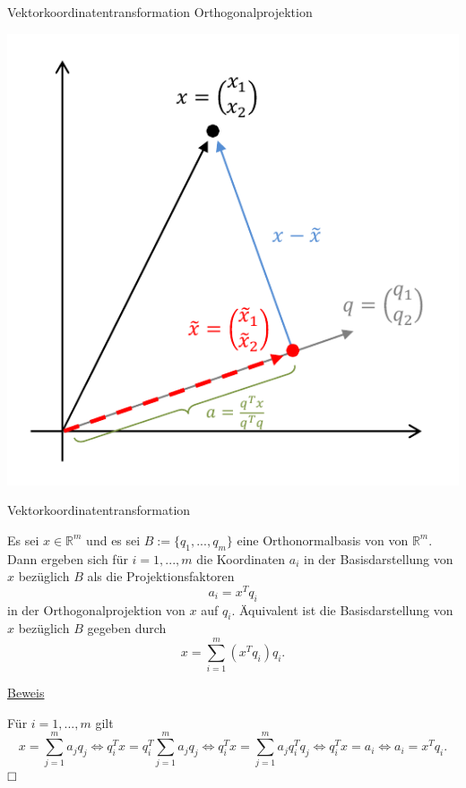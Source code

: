 \documentclass[
  8pt,
  ignorenonframetext,
]{beamer}
\begin{document}
\begin{frame}{Vektorkoordinatentransformation}
\protect\hypertarget{vektorkoordinatentransformation-2}{}
Orthogonalprojektion

\begin{center}\includegraphics[width=0.6\linewidth]{4_Abbildungen/mvda_4_orthogonale_vektorprojektion} \end{center}
\end{frame}

\begin{frame}{Vektorkoordinatentransformation}
\protect\hypertarget{vektorkoordinatentransformation-3}{}
\footnotesize
\begin{theorem}
\justifying
\normalfont
Es sei $x \in \mathbb{R}^m$ und es sei $B := \{q_1,...,q_m\}$ eine Orthonormalbasis
von von $\mathbb{R}^m$. Dann ergeben sich für $i = 1,...,m$ die Koordinaten $a_i$ in
der Basisdarstellung von $x$ bezüglich $B$ als die Projektionsfaktoren
\begin{equation}
a_i = x^T q_i
\end{equation}
in der Orthogonalprojektion von $x$ auf $q_i$. Äquivalent ist die
Basisdarstellung von $x$ bezüglich $B$ gegeben durch
\begin{equation}
x = \sum_{i=1}^m (x^T q_i)q_i.
\end{equation}
\end{theorem}

\footnotesize

\underline{Beweis}

Für \(i = 1,...,m\) gilt \begin{equation}
x = \sum_{j=1}^m a_j q_j
\Leftrightarrow
q_i^T x = q_i^T \sum_{j=1}^m a_j q_j
\Leftrightarrow
q_i^T x = \sum_{j=1}^m a_j q_i^Tq_j
\Leftrightarrow
q_i^T x = a_i
\Leftrightarrow
a_i = x^T q_i.
\end{equation} \(\hfill \Box\)
\end{frame}
\end{document}
